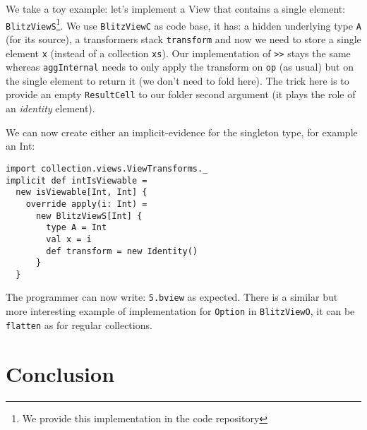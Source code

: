 \documentclass[a4paper,12pt,twocolumn]{article}
\begin{document}
We take a toy example: let's implement a View that contains a single element: \verb|BlitzViewS|\footnote{We provide this implementation in the code repository}.
We use \verb|BlitzViewC| as code base, it has: a hidden underlying type \verb|A| (for its source), a transformers stack \verb|transform| and now we need to store a single element \verb|x| (instead of a collection \verb|xs|).
Our implementation of \verb|>>| stays the same whereas \verb|aggInternal| needs to only apply the transform on \verb|op| (as usual) but on the single element to return it (we don't need to fold here).
The trick here is to provide an empty \verb|ResultCell| to our folder second argument (it plays the role of an {\it identity} element).

We can now create either an implicit-evidence for the singleton type, for example an Int:
\begin{lstlisting}
import collection.views.ViewTransforms._
implicit def intIsViewable =
  new isViewable[Int, Int] {
    override apply(i: Int) =
      new BlitzViewS[Int] {
        type A = Int
        val x = i
        def transform = new Identity()
      }
  }
\end{lstlisting}
The programmer can now write: \verb|5.bview| as expected.
There is a similar but more interesting example of implementation for \verb|Option| in \verb|BlitzViewO|, it can be \verb|flatten| as for regular collections.

\section{Conclusion}
\lipsum[7]

{}

\end{document}

